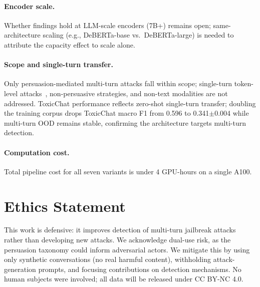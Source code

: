 \paragraph{Encoder scale.}
Whether findings hold at LLM-scale encoders (7B+) remains open; same-architecture scaling (e.g., DeBERTa-base vs.\ DeBERTa-large) is needed to attribute the capacity effect to scale alone.

\paragraph{Scope and single-turn transfer.}
Only persuasion-mediated multi-turn attacks fall within scope; single-turn token-level attacks~\citep{zou2023gcg}, non-persuasive strategies, and non-text modalities are not addressed. ToxicChat performance reflects zero-shot single-turn transfer; doubling the training corpus drops ToxicChat macro F1 from 0.596 to 0.341$\pm$0.004 while multi-turn OOD remains stable, confirming the architecture targets multi-turn detection.

\paragraph{Computation cost.}
Total pipeline cost for all seven variants is under 4 GPU-hours on a single A100.

\section*{Ethics Statement}

This work is defensive: it improves detection of multi-turn jailbreak attacks rather than developing new attacks. We acknowledge dual-use risk, as the persuasion taxonomy could inform adversarial actors. We mitigate this by using only synthetic conversations (no real harmful content), withholding attack-generation prompts, and focusing contributions on detection mechanisms. No human subjects were involved; all data will be released under CC BY-NC 4.0.
